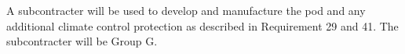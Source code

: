 A subcontracter will be used to develop and manufacture the pod and any additional climate control protection as described in Requirement 29 and 41. The subcontracter will be Group G. 